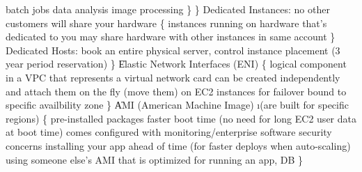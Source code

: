       \> batch jobs
      \> data analysis
      \> image processing
    \}
  \}
  \> Dedicated Instances: no other customers will share your hardware \{
    \> instances running on hardware that's dedicated to you
    \> may share hardware with other instances in same account
  \}
  \> Dedicated Hosts: book an entire physical server, control instance placement (3 year period reservation)
\}
\|
Elastic Network Interfaces (ENI) \{
  \> logical component in a VPC that represents a virtual network card
  \> can be created independently and attach them on the fly (move them) on EC2 instances for failover
  \> bound to specific availbility zone
\}
\|
AMI (American Machine Image) \i{(are built for specific regions)} \{
  \> pre-installed packages
  \> faster boot time (no need for long EC2 user data at boot time)
  \> comes configured with monitoring/enterprise software
  \> security concerns
  \> installing your app ahead of time (for faster deploys when auto-scaling)
  \> using someone else's AMI that is optimized for running an app, DB
\}
